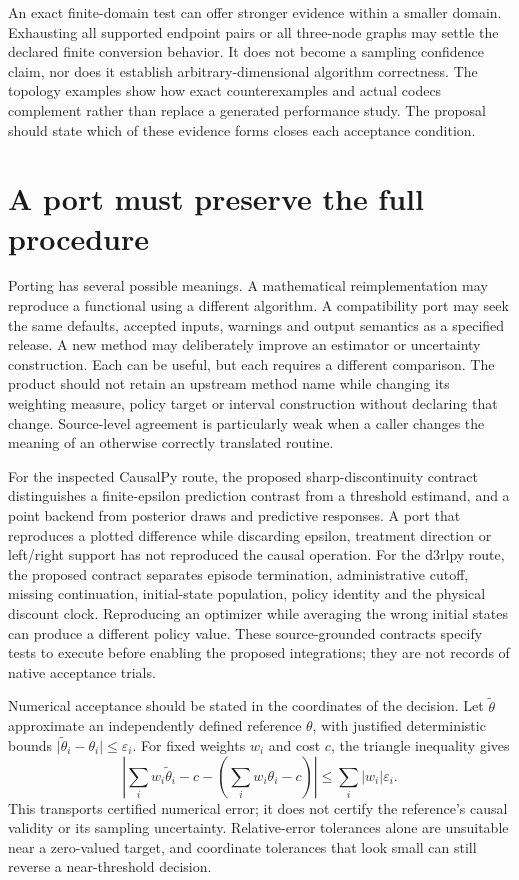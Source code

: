 An exact finite-domain test can offer stronger evidence within a smaller
domain. Exhausting all supported endpoint pairs or all three-node graphs
may settle the declared finite conversion behavior. It does not become a
sampling confidence claim, nor does it establish arbitrary-dimensional
algorithm correctness. The topology examples show how exact counterexamples
and actual codecs complement rather than replace a generated performance
study. The proposal should state which of these evidence forms closes each
acceptance condition.
\citep{exec16_topology_exact,exec16_topology_codec}

\section{A port must preserve the full procedure}

Porting has several possible meanings. A mathematical reimplementation may
reproduce a functional using a different algorithm. A compatibility port may
seek the same defaults, accepted inputs, warnings and output semantics as a
specified release. A new method may deliberately improve an estimator or
uncertainty construction. Each can be useful, but each requires a different
comparison. The product should not retain an upstream method name while
changing its weighting measure, policy target or interval construction without
declaring that change. Source-level agreement is particularly weak when a
caller changes the meaning of an otherwise correctly translated routine.

For the inspected CausalPy route, the proposed sharp-discontinuity contract
distinguishes a finite-epsilon prediction contrast from a threshold estimand,
and a point backend from posterior draws and predictive responses. A port that
reproduces a plotted difference while discarding epsilon, treatment direction
or left/right support has not reproduced the causal operation. For the d3rlpy
route, the proposed contract separates episode termination, administrative
cutoff, missing continuation, initial-state population, policy identity and
the physical discount clock. Reproducing an optimizer while averaging the
wrong initial states can produce a different policy value. These source-grounded
contracts specify tests to execute before enabling the proposed integrations;
they are not records of native acceptance trials.
\citep{exec14_causalpy_decision,exec15_d3rlpy_contract}

Numerical acceptance should be stated in the coordinates of the decision.
Let \(\widetilde\theta\) approximate an independently defined reference
\(\theta\), with justified deterministic bounds
\(\lvert\widetilde\theta_i-\theta_i\rvert\leq\varepsilon_i\). For fixed
weights \(w_i\) and cost \(c\), the triangle inequality gives
\[
 \left|\sum_iw_i\widetilde\theta_i-c-
              \left(\sum_iw_i\theta_i-c\right)\right|
 \leq\sum_i|w_i|\varepsilon_i.
\]
This transports certified numerical error; it does not certify the reference's
causal validity or its sampling uncertainty. Relative-error tolerances alone
are unsuitable near a zero-valued target, and coordinate tolerances that look
small can still reverse a near-threshold decision.

